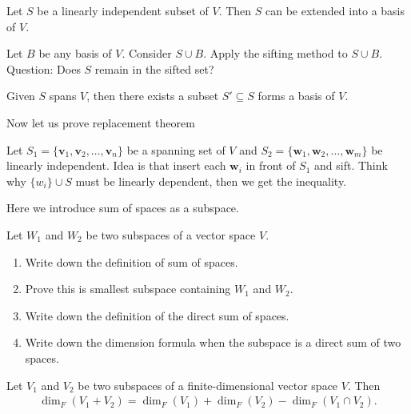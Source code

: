 \documentclass[12pt]{article}
\begin{document}
\begin{theorem}
    Let $S$ be a linearly independent subset of $V$.
    Then $S$ can be extended into a basis of $V$.
\end{theorem}
\begin{tcolorbox}[boxrule=0.5pt]
\begin{pf}
    Let $B$ be any basis of $V$. Consider $S\cup B$. Apply the sifting method to $S\cup B$.
    Question: Does $S$ remain in the sifted set?
\end{pf}
\end{tcolorbox}

\begin{theorem}
Given $S$ spans $V$, then there exists a subset $S'\subseteq S$ forms a basis of $V$.
\end{theorem}


Now let us prove replacement theorem
\begin{pf}
Let  $S_1=\{\mathbf{v}_1,\mathbf{v}_2, \ldots ,\mathbf{v}_n\}$ be a spanning set of $V$ and
    $S_2=\{\mathbf{w}_1, \mathbf{w}_2, \ldots ,\mathbf{w}_m\}$ be linearly independent.
Idea is that insert each $\mathbf{w}_i$ in front of $S_1$ and sift.
Think why $\{w_i\}\cup S$ must be linearly dependent, then we get the inequality.
\end{pf}

Here we introduce sum of spaces as a subspace.
\begin{exercise}
Let $W_1$ and $W_2$ be two subspaces of a vector space $V$.
\begin{enumerate}
    \item Write down the definition of sum of spaces.
    \item Prove this is smallest subspace containing $W_1$ and $W_2$.
    \item Write down the definition of the direct sum of spaces.
    \item Write down the dimension formula when the subspace is a direct sum of two spaces.
\end{enumerate}
\end{exercise}

\begin{theorem}
    Let $V_1$ and $V_2$ be two subspaces of a finite-dimensional vector space $V$.
    Then
    \begin{align*}
        \dim_F(V_1+V_2)=\dim_F(V_1)+\dim_F(V_2)-\dim_F(V_1\cap V_2).
    \end{align*}
\end{theorem}
\end{document}
